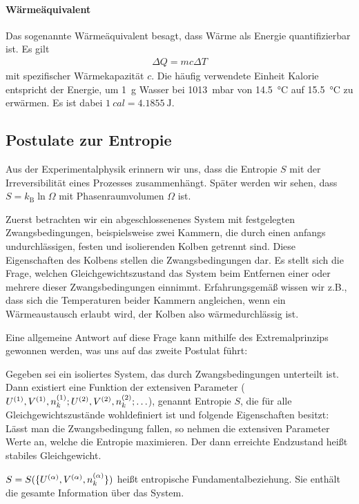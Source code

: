 \paragraph*{Wärmeäquivalent}

Das sogenannte Wärmeäquivalent besagt, dass Wärme als Energie quantifizierbar ist. Es gilt
\begin{align*}
    \Delta Q = mc\Delta T
\end{align*}
mit spezifischer Wärmekapazität $c$.
Die häufig verwendete Einheit Kalorie entspricht der Energie, um \SI{1}{\g} Wasser bei \SI{1013}{\milli\bar} von \SI{14,5}{\degreeCelsius} auf \SI{15,5}{\degreeCelsius} zu erwärmen. Es ist dabei $\SI{1}{cal} = \SI{4,1855}{\joule}$.



\subsection{Postulate zur Entropie}

Aus der Experimentalphysik erinnern wir uns, dass die Entropie $S$ mit der Irreversibilität eines Prozesses zusammenhängt. Später werden wir sehen, dass $S=k_\mathrm{B}\ln{\Omega}$ mit Phasenraumvolumen $\Omega$ ist. 

Zuerst betrachten wir ein abgeschlossenenes System mit festgelegten Zwangsbedingungen, beispielsweise zwei Kammern, die durch einen anfangs undurchlässigen, festen und isolierenden Kolben getrennt sind. Diese Eigenschaften des Kolbens stellen die Zwangsbedingungen dar. Es stellt sich die Frage, welchen Gleichgewichtszustand das System beim Entfernen einer oder mehrere dieser Zwangsbedingungen einnimmt. Erfahrungsgemäß wissen wir z.B., dass sich die Temperaturen beider Kammern angleichen, wenn ein Wärmeaustausch erlaubt wird, der Kolben also wärmedurchlässig ist. 

Eine allgemeine Antwort auf diese Frage kann mithilfe des Extremalprinzips gewonnen werden, was uns auf das zweite Postulat führt:

\begin{postulate}
    \label{post:entropie_maximierung}
    Gegeben sei ein isoliertes System, das durch Zwangsbedingungen unterteilt ist. Dann existiert eine Funktion der extensiven Parameter ($U^{(1)},V^{(1)},n_k^{(1)};U^{(2)},V^{(2)},n_k^{(2)}; \ldots$), genannt Entropie $S$, die für alle Gleichgewichtszustände wohldefiniert ist und folgende Eigenschaften besitzt: Lässt man die Zwangsbedingung fallen, so nehmen die extensiven Parameter Werte an, welche die Entropie maximieren. Der dann erreichte Endzustand heißt stabiles Gleichgewicht. 

    $S=S(\{U^{(\alpha)},V^{(\alpha)},n_k^{(\alpha)}\})$ heißt entropische Fundamentalbeziehung. Sie enthält die gesamte Information über das System. 
\end{postulate}


